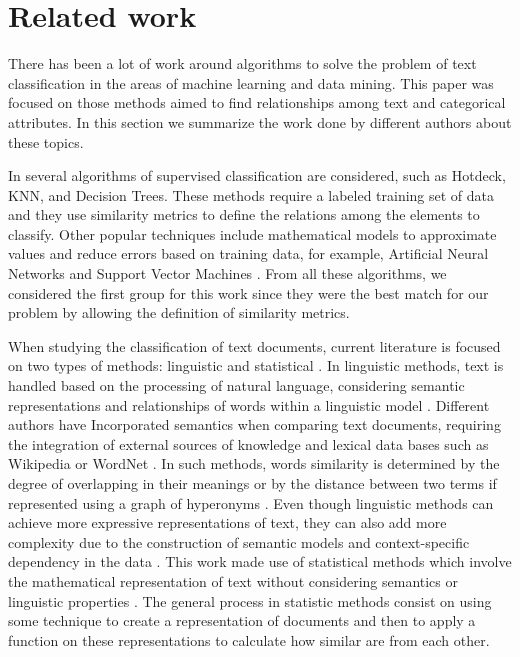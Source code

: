 \documentclass[preprint,12pt,3p]{elsarticle}
\begin{document}
\section{Related work}
\label{related_work}

There has been a lot of work around algorithms to solve the problem of text classification in the areas of machine learning and data mining. This paper was focused on those methods aimed to find relationships among text and categorical attributes. In this section we summarize the work done by different authors about these topics.\par

In \cite{tran2015multiple,vijayan2017text} several algorithms of supervised classification are considered, such as Hotdeck, KNN, and Decision Trees. These methods require a labeled training set of data and they use similarity metrics to define the relations among the elements to classify. Other popular techniques include mathematical models to approximate values and reduce errors based on training data, for example, Artificial Neural Networks and Support Vector Machines \cite{vijayan2017text}. From all these algorithms, we considered the first group for this work since they were the best match for our problem by allowing the definition of similarity metrics.\par

When studying the classification of text documents, current literature is focused on two types of methods: linguistic and statistical \cite{srivastava2009text}. In linguistic methods, text is handled based on the processing of natural language, considering semantic representations and relationships of words within a linguistic model \cite{srivastava2009text}. Different authors have Incorporated semantics when comparing text documents, requiring the integration of external sources of knowledge and lexical data bases such as Wikipedia or WordNet  \cite{seifzadeh2015short,devraj2015twitter}. In such methods, words similarity is determined by the degree of overlapping in their meanings or by the distance between two terms if represented using a graph of hyperonyms \cite{ devraj2015twitter}. Even though linguistic methods can achieve more expressive representations of text, they can also add more complexity due to the construction of semantic models and context-specific dependency in the data \cite{srivastava2009text}. This work made use of statistical methods which involve the mathematical representation of text without considering semantics or linguistic properties \cite{srivastava2009text}. The general process in statistic methods consist on using some technique to create a representation of documents and then to apply a function on these representations to calculate how similar are from each other. \par
\end{document}
